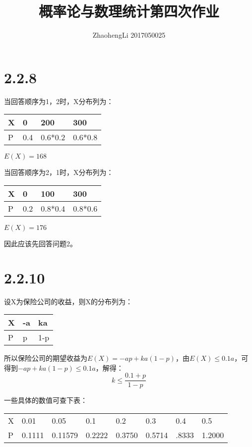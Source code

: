 \documentclass{article}
\title{概率论与数理统计第四次作业}
\author{ZhaohengLi 2017050025}
\begin{document}
\maketitle

\section{2.2.8}
当回答顺序为1，2时，X分布列为：
\begin{table}[H]
\centering
\begin{tabular}{l|lll}
\hline
X & 0   & 200     & 300     \\ \hline
P & 0.4 & 0.6*0.2 & 0.6*0.8 \\ \hline
\end{tabular}
\end{table}

$E(X)=168$

当回答顺序为2，1时，X分布列为：
\begin{table}[H]
\centering
\begin{tabular}{l|lll}
\hline
X & 0   & 100     & 300     \\ \hline
P & 0.2 & 0.8*0.4 & 0.8*0.6 \\ \hline
\end{tabular}
\end{table}

$E(X)=176$

因此应该先回答问题2。
\section{2.2.10}
设X为保险公司的收益，则X的分布列为：
\begin{table}[H]
\centering
\begin{tabular}{l|ll}
\hline
X & -a & ka  \\ \hline
P & p  & 1-p \\ \hline
\end{tabular}
\end{table}

所以保险公司的期望收益为$E(X)=-ap+ka(1-p)$，由$E(X)\leq 0.1a$，可得到$-ap+ka(1-p)\leq 0.1a$，解得：
$$k\leq \frac{0.1+p}{1-p}$$

一些具体的数值可查下表：
\begin{table}[H]
\centering
\begin{tabular}{llllllll}
X & 0.01   & 0.05    & 0.1    & 0.2    & 0.3    & 0.4   & 0.5    \\
P & 0.1111 & 0.11579 & 0.2222 & 0.3750 & 0.5714 & .8333 & 1.2000
\end{tabular}
\end{table}
\end{document}
